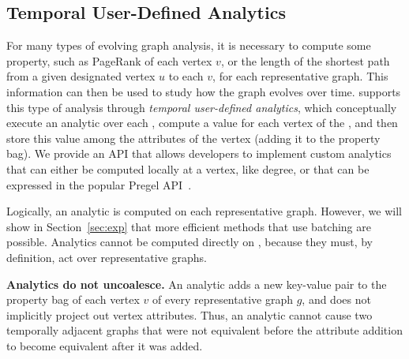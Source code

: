 \subsection{Temporal User-Defined Analytics}
\label{sec:analytics}

For many types of evolving graph analysis, it is necessary to compute
some property, such as PageRank of each vertex $v$, or the length of
the shortest path from a given designated vertex $u$ to each $v$, for
each representative graph.  This information can then be used to study
how the graph evolves over time.  \ql supports this type of analysis
through {\em temporal user-defined analytics}, which conceptually
execute an analytic over each \rg, compute a value for each vertex of
the \rg, and then store this value among the attributes of the vertex
(adding it to the property bag).  We provide an API that allows
developers to implement custom analytics that can either be computed
locally at a vertex, like degree, or that can be expressed in the
popular Pregel API~\cite{DBLP:conf/sigmod/MalewiczABDHLC10}.

Logically, an analytic is computed on each representative graph.
However, we will show in Section~\ref{sec:exp} that more efficient
methods that use batching are possible.  Analytics cannot be computed
directly on \tve, because they must, by definition, act over
representative graphs.

{\bf Analytics do not uncoalesce.} An analytic adds a new key-value
pair to the property bag of each vertex $v$ of every representative
graph $g$, and does not implicitly project out vertex attributes.
Thus, an analytic cannot cause two temporally
adjacent graphs that were not equivalent before
the attribute addition to become
equivalent after it was added.



